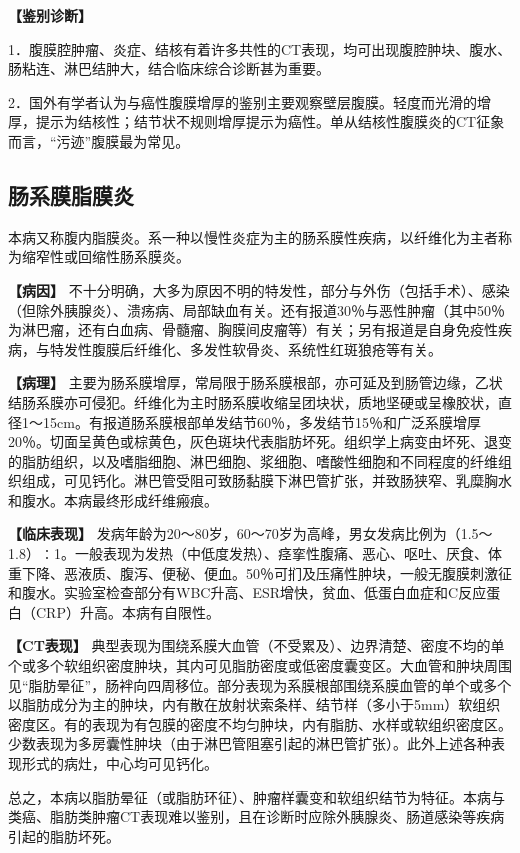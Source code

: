 \textbf{【鉴别诊断】}

1．腹膜腔肿瘤、炎症、结核有着许多共性的CT表现，均可出现腹腔肿块、腹水、肠粘连、淋巴结肿大，结合临床综合诊断甚为重要。

2．国外有学者认为与癌性腹膜增厚的鉴别主要观察壁层腹膜。轻度而光滑的增厚，提示为结核性；结节状不规则增厚提示为癌性。单从结核性腹膜炎的CT征象而言，“污迹”腹膜最为常见。

\subsection{肠系膜脂膜炎}

本病又称腹内脂膜炎。系一种以慢性炎症为主的肠系膜性疾病，以纤维化为主者称为缩窄性或回缩性肠系膜炎。

\textbf{【病因】}
不十分明确，大多为原因不明的特发性，部分与外伤（包括手术）、感染（但除外胰腺炎）、溃疡病、局部缺血有关。还有报道30％与恶性肿瘤（其中50％为淋巴瘤，还有白血病、骨髓瘤、胸膜间皮瘤等）有关；另有报道是自身免疫性疾病，与特发性腹膜后纤维化、多发性软骨炎、系统性红斑狼疮等有关。

\textbf{【病理】}
主要为肠系膜增厚，常局限于肠系膜根部，亦可延及到肠管边缘，乙状结肠系膜亦可侵犯。纤维化为主时肠系膜收缩呈团块状，质地坚硬或呈橡胶状，直径1～15cm。有报道肠系膜根部单发结节60％，多发结节15％和广泛系膜增厚20％。切面呈黄色或棕黄色，灰色斑块代表脂肪坏死。组织学上病变由坏死、退变的脂肪组织，以及嗜脂细胞、淋巴细胞、浆细胞、嗜酸性细胞和不同程度的纤维组织组成，可见钙化。淋巴管受阻可致肠黏膜下淋巴管扩张，并致肠狭窄、乳糜胸水和腹水。本病最终形成纤维瘢痕。

\textbf{【临床表现】}
发病年龄为20～80岁，60～70岁为高峰，男女发病比例为（1.5～1.8）∶1。一般表现为发热（中低度发热）、痉挛性腹痛、恶心、呕吐、厌食、体重下降、恶液质、腹泻、便秘、便血。50％可扪及压痛性肿块，一般无腹膜刺激征和腹水。实验室检查部分有WBC升高、ESR增快，贫血、低蛋白血症和C反应蛋白（CRP）升高。本病有自限性。

\textbf{【CT表现】}
典型表现为围绕系膜大血管（不受累及）、边界清楚、密度不均的单个或多个软组织密度肿块，其内可见脂肪密度或低密度囊变区。大血管和肿块周围见“脂肪晕征”，肠袢向四周移位。部分表现为系膜根部围绕系膜血管的单个或多个以脂肪成分为主的肿块，内有散在放射状索条样、结节样（多小于5mm）软组织密度区。有的表现为有包膜的密度不均匀肿块，内有脂肪、水样或软组织密度区。少数表现为多房囊性肿块（由于淋巴管阻塞引起的淋巴管扩张）。此外上述各种表现形式的病灶，中心均可见钙化。

总之，本病以脂肪晕征（或脂肪环征）、肿瘤样囊变和软组织结节为特征。本病与类癌、脂肪类肿瘤CT表现难以鉴别，且在诊断时应除外胰腺炎、肠道感染等疾病引起的脂肪坏死。

